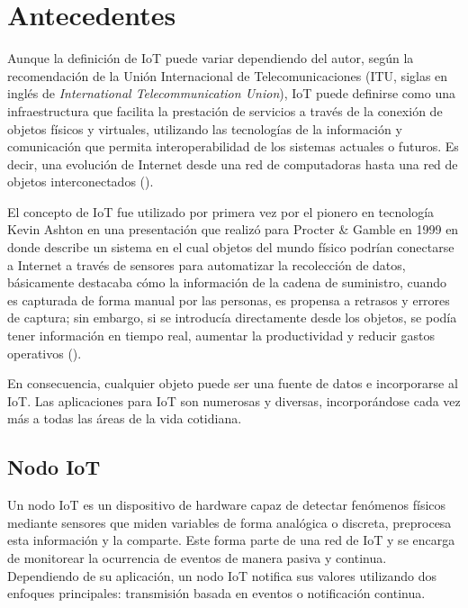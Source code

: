 \chapter{Antecedentes}

Aunque la definición de IoT puede variar dependiendo del autor, según la recomendación de la Unión Internacional de Telecomunicaciones (ITU, siglas en inglés de \textit{International Telecommunication Union}), IoT puede definirse como una infraestructura que facilita la prestación de servicios a través de la conexión de objetos físicos y virtuales, utilizando las tecnologías de la información y comunicación que permita interoperabilidad de los sistemas actuales o futuros. Es decir, una evolución de Internet desde una red de computadoras hasta una red de objetos interconectados (\citep{itu2014}).

\vspace{0.5cm}

El concepto de IoT fue utilizado por primera vez por el pionero en tecnología Kevin Ashton en una presentación que realizó para Procter \& Gamble en 1999 en donde describe un sistema en el cual objetos del mundo físico podrían conectarse a Internet a través de sensores para automatizar la recolección de datos, básicamente destacaba cómo la información de la cadena de suministro, cuando es capturada de forma manual por las personas, es propensa a retrasos y errores de captura; sin embargo, si se introducía directamente desde los objetos, se podía tener información en tiempo real, aumentar la productividad y reducir gastos operativos (\cite{ashton2009}).

\vspace{0.5cm}

En consecuencia, cualquier objeto puede ser una fuente de datos e incorporarse al IoT. Las aplicaciones para IoT son numerosas y diversas, incorporándose cada vez más a todas las áreas de la vida cotidiana.

\section{Nodo IoT}

Un nodo IoT es un dispositivo de hardware capaz de detectar fenómenos físicos mediante sensores que miden variables de forma analógica o discreta, preprocesa esta información y la comparte. Este forma parte de una red de IoT y se encarga de monitorear la ocurrencia de eventos de manera pasiva y continua. Dependiendo de su aplicación, un nodo IoT notifica sus valores utilizando dos enfoques principales: transmisión basada en eventos o notificación continua.

